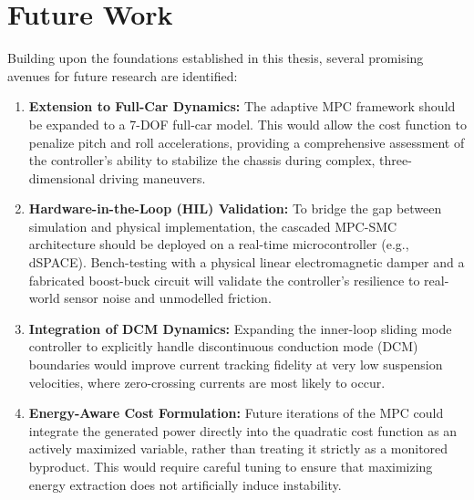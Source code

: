 \chapter{Future Work}
\label{chap:todo}
Building upon the foundations established in this thesis, several promising avenues for future research are identified:
\begin{enumerate}
    \item \textbf{Extension to Full-Car Dynamics:} The adaptive MPC framework should be expanded to a 7-DOF full-car model. This would allow the cost function to penalize pitch and roll accelerations, providing a comprehensive assessment of the controller's ability to stabilize the chassis during complex, three-dimensional driving maneuvers.
    \item \textbf{Hardware-in-the-Loop (HIL) Validation:} To bridge the gap between simulation and physical implementation, the cascaded MPC-SMC architecture should be deployed on a real-time microcontroller (e.g., dSPACE). Bench-testing with a physical linear electromagnetic damper and a fabricated boost-buck circuit will validate the controller's resilience to real-world sensor noise and unmodelled friction.
    \item \textbf{Integration of DCM Dynamics:} Expanding the inner-loop sliding mode controller to explicitly handle discontinuous conduction mode (DCM) boundaries would improve current tracking fidelity at very low suspension velocities, where zero-crossing currents are most likely to occur.
    \item \textbf{Energy-Aware Cost Formulation:} Future iterations of the MPC could integrate the generated power directly into the quadratic cost function as an actively maximized variable, rather than treating it strictly as a monitored byproduct. This would require careful tuning to ensure that maximizing energy extraction does not artificially induce instability.
\end{enumerate}
